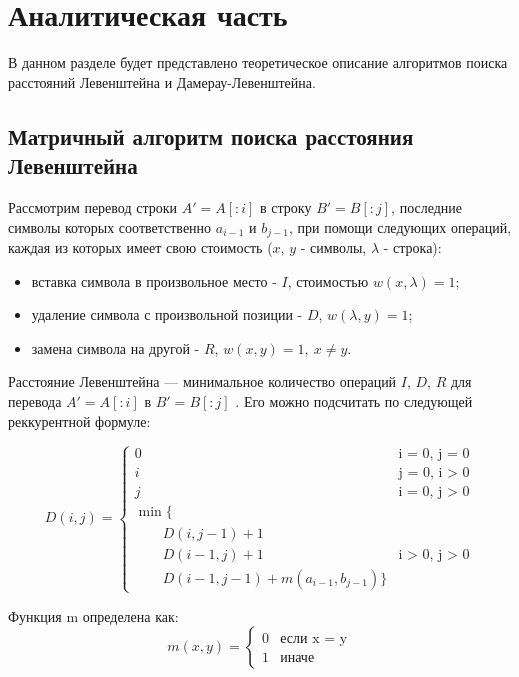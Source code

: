 \chapter{Аналитическая часть}

В данном разделе будет представлено теоретическое описание алгоритмов поиска расстояний Левенштейна и Дамерау-Левенштейна.

\section{Матричный алгоритм поиска расстояния Левенштейна}

Рассмотрим перевод строки $A'= A[:i]$ в строку $B' = B[:j]$, последние символы которых соответственно $a_{i-1}$ и $b_{j-1}$, при помощи следующих операций, каждая из которых имеет свою стоимость ($x$, $y$ - символы, $\lambda$ - строка):

\begin{itemize}
	\item вставка символа в произвольное место - $I$, стоимостью $w(x,\lambda)=1$;
	\item удаление символа с произвольной позиции - $D$, $w(\lambda,y)=1$;
	\item замена символа на другой - $R$, $w(x,y)=1, \medspace x \neq y$.
\end{itemize}

Расстояние Левенштейна --- минимальное количество операций $I$, $D$, $R$ для перевода $A'= A[:i]$ в $B' = B[:j]$ \cite{levenshtein}. Его можно подсчитать по следующей реккурентной формуле:

\begin{equation}
	\label{eq:rL}
	D(i, j) = \begin{cases}
		0 &\text{i = 0, j = 0}\\
		i &\text{j = 0, i > 0}\\
		j &\text{i = 0, j > 0}\\
		\min \lbrace \\
		\qquad D(i, j-1) + 1\\
		\qquad D(i-1, j) + 1 &\text{i > 0, j > 0}\\
		\qquad D(i-1, j-1) + m(a_{i-1}, b_{j-1})
		\rbrace
	\end{cases}
\end{equation}

Функция m определена как:
\begin{equation}
	\label{eq:rm}
	m(x, y) = \begin{cases}
		0 &\text{если x = y}\\
		1 &\text{иначе}
	\end{cases}
\end{equation}

